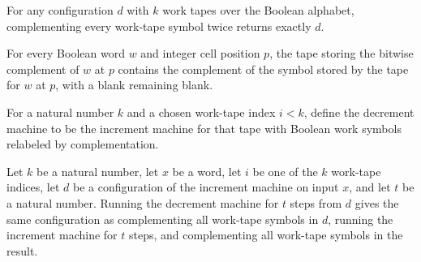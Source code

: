 \begin{lemma}
\label{Turing.counter_complement_twice}
\leanok
{}
For any configuration $d$ with $k$ work tapes over the Boolean alphabet, complementing
every work-tape symbol twice returns exactly $d$.
\end{lemma}

\begin{lemma}
\label{Turing.counter_buffer_complement}
\leanok
{}
For every Boolean word $w$ and integer cell position $p$, the tape storing the bitwise
complement of $w$ at $p$ contains the complement of the symbol stored by the tape for
$w$ at $p$, with a blank remaining blank.
\end{lemma}

\begin{definition}
\label{Turing.decrementTM}
\leanok
{}
For a natural number $k$ and a chosen work-tape index $i<k$, define the decrement
machine to be the increment machine for that tape with Boolean work symbols relabeled by
complementation.
\end{definition}

\begin{lemma}
\label{Turing.counter_decrement_run}
\leanok
{}
Let $k$ be a natural number, let $x$ be a word, let $i$ be one of the $k$ work-tape
indices, let $d$ be a configuration of the increment machine on input $x$, and let $t$
be a natural number. Running the decrement machine for $t$ steps from $d$ gives the same
configuration as complementing all work-tape symbols in $d$, running the increment
machine for $t$ steps, and complementing all work-tape symbols in the result.
\end{lemma}

